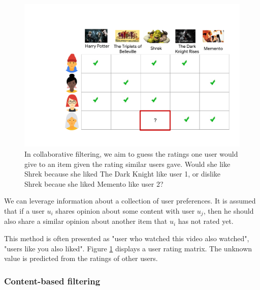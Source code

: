 \begin{figure}
    \centering
    \includegraphics[scale=0.5]{70-files/collaborative-filtering.pdf}
    \caption{In collaborative filtering, we aim to guess the ratings one user would give to an item given the rating similar users gave. Would she like Shrek because she liked The Dark Knight like user 1, or dislike Shrek becaue she liked Memento like user 2?}
    \label{fig:collab-filtering}
\end{figure}

We can leverage information about a collection of user preferences. It is assumed that if a user $u_i$ shares opinion about some content with user $u_j$, then he should also share a similar opinion about another item that $u_i$ has not rated yet.

This method is often presented as "user who watched this video also watched", "users like you also liked". Figure \ref{fig:collab-filtering} displays a user rating matrix. The unknown value is predicted from the ratings of other users.

\subsubsection{Content-based filtering}

